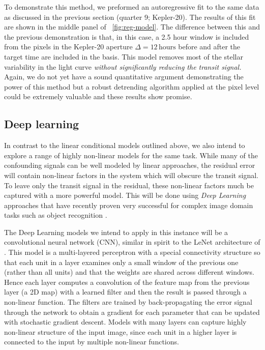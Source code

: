 \documentclass[letterpaper,12pt,whitepaper]{haastex}
\begin{document}
To demonstrate this method, we preformed an autoregressive fit to the same
data as discussed in the previous section (quarter 9; Kepler-20).
The results of this fit are shown in the middle panel of
\figurename~\ref{fig:reg-model}.
The difference between this and the previous demonstration is that, in this
case, a 2.5 hour window is included from the pixels in the Kepler-20 aperture
$\Delta = 12\,\mathrm{hours}$ before and after the target time are included in
the basis.
This model removes most of the stellar variability in the light curve
  \emph{without significantly reducing the transit signal.}
Again, we do not yet have a sound quantitative argument demonstrating the power of
this method but a robust detrending algorithm applied at the pixel level could
be extremely valuable and these results show promise.

\subsection{Deep learning}\label{sec:deep}

In contrast to the linear conditional models outlined above, we also
intend to explore a range of highly non-linear models for the same
task. While many of the confounding signals can be well modeled by
linear approaches, the residual error will contain non-linear
factors in the system which will obscure the transit signal. To leave
only the transit signal in the residual, these non-linear factors much
be captured with a more powerful model. This will be done using \emph{Deep
Learning} approaches that have recently proven very successful for
complex image domain tasks such as object recognition \citep{Kriz12}.

The Deep Learning models we intend to apply in this instance will be a
convolutional neural network (CNN), similar in spirit to the LeNet
architecture of \citet{LeCun1998}. This model is a
multi-layered perceptron with a special connectivity structure so that
each unit in a layer examines only a small window of the previous one
(rather than all units) and that the weights are shared across
different windows. Hence each layer computes a convolution of the
feature map from the previous layer (a 2D map) with a learned filter
and then the result is passed through a non-linear function. The
filters are trained by back-propagating the error signal through the
network to obtain a gradient for each parameter that can be updated
with stochastic gradient descent. Models with many layers can capture
highly non-linear structure of the input image, since each unit in a
higher layer is connected to the input by multiple non-linear
functions.
\end{document}
